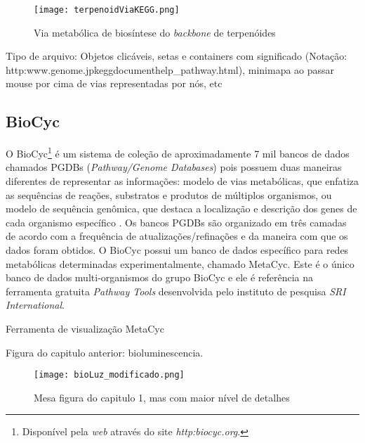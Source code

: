 \begin{figure}[h]
\centering
\texttt{[image: terpenoidViaKEGG.png]}
\caption{Via metabólica de biosíntese do \textit{backbone} de terpenóides}
\label{terpenoidBackboneKEGG}
\end{figure}

Tipo de arquivo:
Objetos clicáveis, setas e containers com significado (Notação: http:\/\/www.genome.jp\/kegg\/document\/help\_pathway.html), minimapa ao passar mouse por cima de vias representadas por nós, etc


\subsection{BioCyc}

\indent O BioCyc\footnote{Disponível pela \textit{web} através do site \textit{http:\/\/biocyc.org}.} é um sistema de coleção de aproximadamente 7 mil bancos de dados chamados PGDBs (\textit{Pathway/Genome Databases}) pois possuem duas maneiras diferentes de representar as informações: modelo de vias metabólicas, que enfatiza as sequências de reações, substratos e produtos de múltiplos organismos, ou modelo de sequência genômica, que destaca a localização e descrição dos genes de cada organismo específico \cite{biocycIntro}. Os bancos PGDBs são organizado em três camadas de acordo com a frequência de atualizações/refinações e da maneira com que os dados foram obtidos. O BioCyc possui um banco de dados específico para redes metabólicas determinadas experimentalmente, chamado MetaCyc. Este é o único banco de dados multi-organismos do grupo BioCyc e ele é referência na ferramenta gratuita \textit{Pathway Tools} desenvolvida pelo instituto de pesquisa \textit{SRI International}.

\indent Ferramenta de visualização MetaCyc

Figura do capitulo anterior: bioluminescencia.

\begin{figure}[h]
\centering
\texttt{[image: bioLuz\_modificado.png]}
\caption{Mesa figura do capitulo 1, mas com maior nível de detalhes}
\label{terpenoidBackboneKEGG}
\end{figure}


